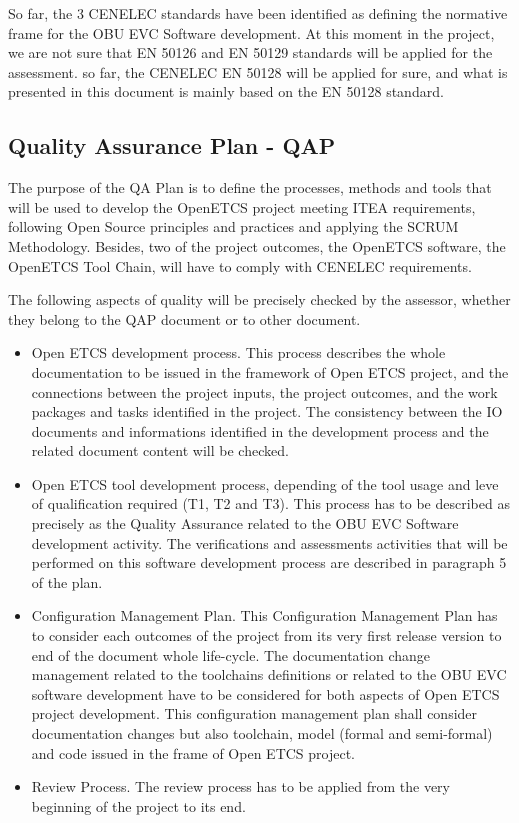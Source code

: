 \documentclass{template/openetcs_article}
\begin{document}
So far, the 3 CENELEC standards have been identified as defining the normative frame for the OBU EVC Software development. At this moment in the project, we are not sure that EN 50126 and EN 50129 standards will  be applied for the assessment. so far, the CENELEC EN 50128 will be applied for sure, and what is presented in this document is mainly based on the EN 50128 standard.

\subsection{Quality Assurance Plan - QAP}
The purpose of the QA Plan is to define the processes, methods and tools that will be used to develop the OpenETCS project meeting ITEA requirements, following Open Source principles and practices and applying the SCRUM Methodology. Besides, two of the project outcomes, the OpenETCS software, the OpenETCS Tool Chain, will have to comply with CENELEC requirements.

The following aspects of quality will be precisely checked by the assessor, whether they belong to the QAP document or to other document.
\begin{itemize}
\item  Open ETCS development process. This process describes the whole documentation to be issued in the framework of Open ETCS project, and the connections between the project inputs, the project outcomes, and the work packages and tasks identified in the project. The consistency between the IO documents and informations identified in the development process and the related document content will be checked.
\item  Open ETCS tool development process, depending of the tool usage and leve of qualification required (T1, T2 and T3). This process has to be described as precisely as the Quality Assurance related to the OBU EVC Software development activity. The verifications and assessments activities that will be performed on this software development process are described in paragraph 5 of the plan.
\item Configuration Management Plan. This Configuration Management Plan has to consider each outcomes of the project from its very first release version to end of the document whole life-cycle. The documentation change management related to the toolchains definitions or related to the OBU EVC software development have to be considered for both aspects of Open ETCS project development. This configuration management plan shall consider documentation changes but also toolchain, model (formal and semi-formal) and code issued in the frame of Open ETCS project.
\item Review Process. The review process has to be applied from the very beginning of the project to its end.
\end{itemize}
\end{document}
